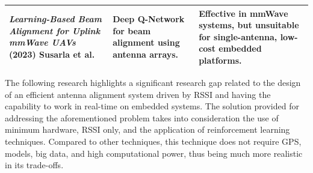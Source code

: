 \begin{longtable}{|
    >{\raggedright\arraybackslash}p{4.3cm} |
    >{\raggedright\arraybackslash}p{4.3cm} |
    >{\raggedright\arraybackslash}p{4.1cm} |}
\textit{Learning-Based Beam Alignment for Uplink mmWave UAVs} (2023) \newline
Susarla et al.
&
Deep Q-Network for beam alignment using antenna arrays.
&
Effective in mmWave systems, but unsuitable for single-antenna, low-cost embedded platforms.
\\ \hline

\end{longtable}


The following research highlights a significant research gap related to the design of an efficient antenna alignment system driven by RSSI and having the capability to work in real-time on embedded systems. The solution provided for addressing the aforementioned problem takes into consideration the use of minimum hardware, RSSI only, and the application of reinforcement learning techniques. Compared to other techniques, this technique does not require GPS, models, big data, and high computational power, thus being much more realistic in its trade-offs.